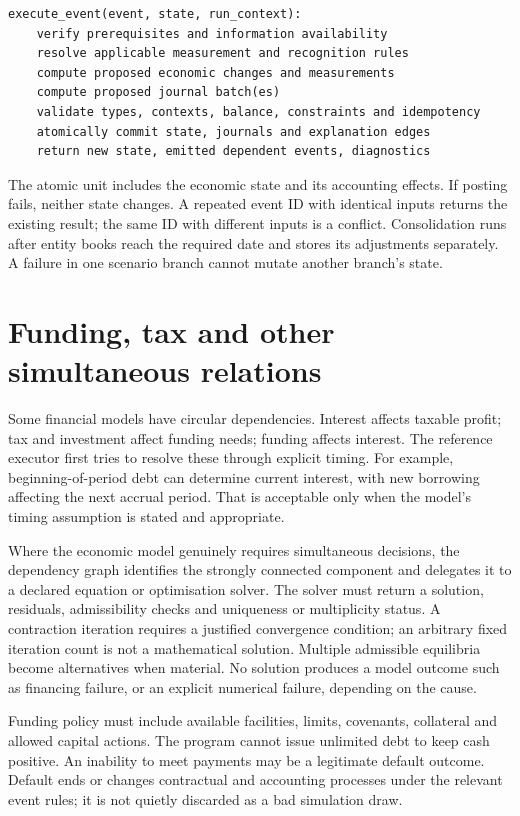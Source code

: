 \begin{lstlisting}
execute_event(event, state, run_context):
    verify prerequisites and information availability
    resolve applicable measurement and recognition rules
    compute proposed economic changes and measurements
    compute proposed journal batch(es)
    validate types, contexts, balance, constraints and idempotency
    atomically commit state, journals and explanation edges
    return new state, emitted dependent events, diagnostics
\end{lstlisting}

The atomic unit includes the economic state and its accounting effects.
If posting fails, neither state changes. A repeated event ID with identical
inputs returns the existing result; the same ID with different inputs is a
conflict. Consolidation runs after entity books reach the required date and
stores its adjustments separately. A failure in one scenario branch cannot
mutate another branch's state.

\section{Funding, tax and other simultaneous relations}

Some financial models have circular dependencies. Interest affects taxable
profit; tax and investment affect funding needs; funding affects interest.
The reference executor first tries to resolve these through explicit timing.
For example, beginning-of-period debt can determine current interest, with
new borrowing affecting the next accrual period. That is acceptable only when
the model's timing assumption is stated and appropriate.

Where the economic model genuinely requires simultaneous decisions, the
dependency graph identifies the strongly connected component and delegates it
to a declared equation or optimisation solver. The solver must return a
solution, residuals, admissibility checks and uniqueness or multiplicity
status. A contraction iteration requires a justified convergence condition;
an arbitrary fixed iteration count is not a mathematical solution. Multiple
admissible equilibria become alternatives when material. No solution produces
a model outcome such as financing failure, or an explicit numerical failure,
depending on the cause.

Funding policy must include available facilities, limits, covenants, collateral
and allowed capital actions. The program cannot issue unlimited debt to keep
cash positive. An inability to meet payments may be a legitimate default
outcome. Default ends or changes contractual and accounting processes under
the relevant event rules; it is not quietly discarded as a bad simulation draw.

